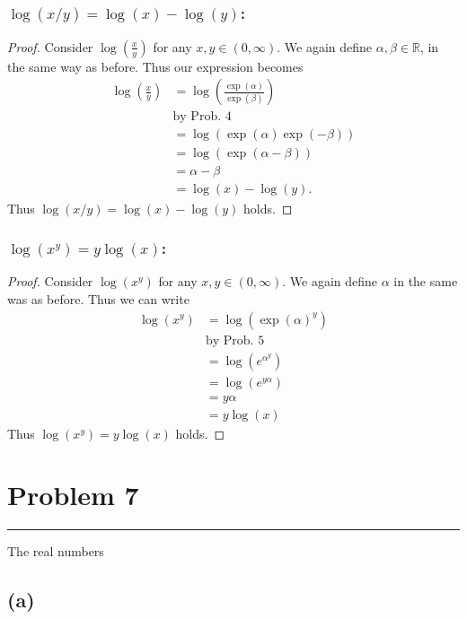 \documentclass[12pt]{amsart}
\newcommand{\usec}[1]{%
\section*{#1}%
\noindent\rule{\textwidth}{2pt}%
\vspace{10pt}%
}
\newcommand{\prob}[1]{Prob. #1}
\newcommand{\R}{\mathbb{R}}
\begin{document}
\subsubsection*{$\log(x/y)=\log(x)-\log(y)$:}%
\label{ssub:_log_x_y_log_x_log_y_}

\begin{proof}
  Consider $\log\left(\frac{x}{y}\right)$ for any $x,y\in(0,\infty)$. We again
  define $\alpha,\beta\in\R$, in the same way as before. Thus our expression
  becomes
  \begin{align*}
    \log\left(\frac{x}{y}\right)&=\log\left(\frac{\exp(\alpha)}{\exp(\beta)}\right)\\
                                &\text{by \prob{4}}\\
                                &=\log(\exp(\alpha)\exp(-\beta))\\
                                &=\log(\exp(\alpha-\beta))\\
                                &=\alpha-\beta\\
                                &=\log(x)-\log(y).
  \end{align*}
  Thus $\log(x/y)=\log(x)-\log(y)$ holds.
\end{proof}

\subsubsection*{$\log(x^y)=y\log(x)$:}%
\label{ssub:_log_x_y_ylog_x_}

\begin{proof}
  Consider $\log(x^y)$ for any $x,y\in(0,\infty)$. We again define $\alpha$ in
  the same was as before. Thus we can write
  \begin{align*}
    \log(x^y)&=\log(\exp(\alpha)^y)\\
             &\text{by \prob{5}}\\
             &=\log(e^{\alpha^y})\\
             &=\log(e^{y\alpha})\\
             &=y\alpha\\
             &=y\log(x)
  \end{align*}
  Thus $\log(x^y)=y\log(x)$ holds.
\end{proof}

\usec{Problem 7}%
\label{sec:problem_7}

The real numbers

\subsection*{(a)}%
\label{sub:_a_}
\end{document}
